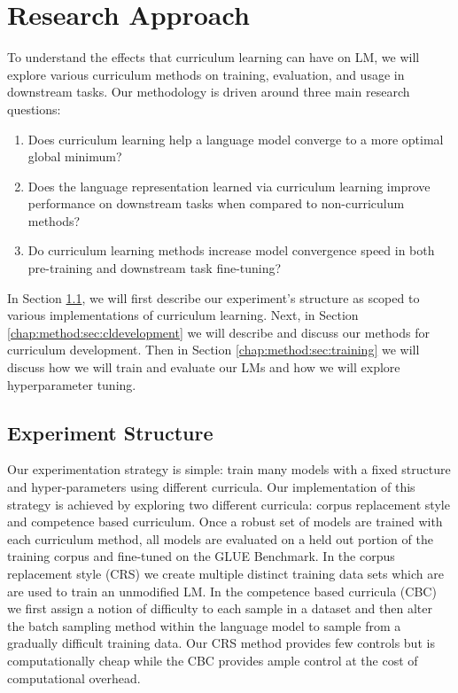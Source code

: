 \chapter{Research Approach}
\label{chap:method}
To understand the effects that curriculum learning can have on LM, we will explore various curriculum methods on training, evaluation, and usage in downstream tasks. 
Our methodology is driven around three main research questions:
\begin{enumerate}
\item Does curriculum learning help a language model converge to a more optimal global minimum? 
\item Does the language representation learned via curriculum learning improve performance on downstream tasks when compared to non-curriculum methods?
\item  Do curriculum learning methods increase model convergence speed in both pre-training and downstream task fine-tuning?
\end{enumerate}
In Section \ref{chap:method:sec:structure}, we will first describe our experiment's structure as scoped to various implementations of curriculum learning. Next, in Section \ref{chap:method:sec:cldevelopment} we will describe and discuss our methods for curriculum development. Then in Section \ref{chap:method:sec:training} we will discuss how we will train and evaluate our LMs and how we will explore hyperparameter tuning.
\section{Experiment Structure}
\label{chap:method:sec:structure}
Our experimentation strategy is simple: train many models with a fixed structure and hyper-parameters using different curricula. Our implementation of this strategy is achieved by exploring two different curricula: corpus replacement style and competence based curriculum. Once a robust set of models are trained with each curriculum method, all models are evaluated on a held out portion of the training corpus and fine-tuned on the GLUE Benchmark. In the corpus replacement style (CRS) we create multiple distinct training data sets which are are used to train an unmodified LM. In the competence based curricula (CBC) we first assign a notion of difficulty to each sample in a dataset and then alter the batch sampling method within the language model to sample from a gradually difficult training data. Our CRS method provides few controls but is computationally cheap while the CBC provides ample control at the cost of computational overhead. \\
